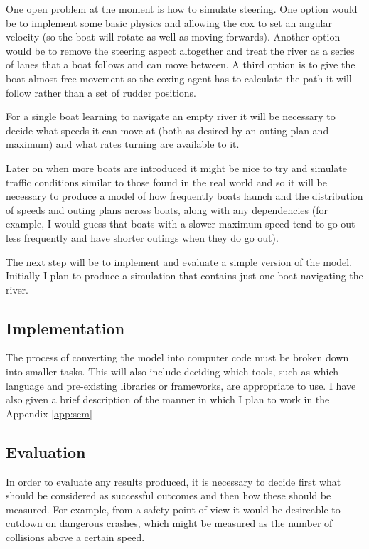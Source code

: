 One open problem at the moment is how to simulate steering. One option would be to implement some basic physics and allowing the cox to set an angular velocity (so the boat will rotate as well as moving forwards). Another option would be to remove the steering aspect altogether and treat the river as a series of lanes that a boat follows and can move between. A third option is to give the boat almost free movement so the coxing agent has to calculate the path it will follow rather than a set of rudder positions.

For a single boat learning to navigate an empty river it will be necessary to decide what speeds it can
move at (both as desired by an outing plan and maximum) and what rates
turning are available to it. 

Later on when more boats are introduced
it might be nice to try and simulate traffic conditions similar to
those found in the real world and
so it will be necessary to produce a model of how frequently boats
launch and the distribution of speeds and outing plans across boats,
along with any dependencies (for example, I would guess that boats
with a slower maximum speed tend to go out less frequently and have
shorter outings when they do go out).

The next step will be to implement and evaluate a simple version of the model. Initially I plan to produce a simulation that contains just one boat navigating the river. 

\subsection{Implementation}
The process of converting
the model into computer code must be broken down into smaller
tasks. This will also include deciding which tools, such as which
language and pre-existing libraries or frameworks, are appropriate 
to use. I have also given a brief description of the manner in which I
plan to work in the Appendix \ref{app:sem}

\subsection{Evaluation}
In order to evaluate any results produced, it is necessary to decide
first what should be considered as successful outcomes and then how
these should be measured. For example, from a safety point of view it
would be desireable to cutdown on dangerous crashes, which might be
measured as the number of collisions above a certain speed.
